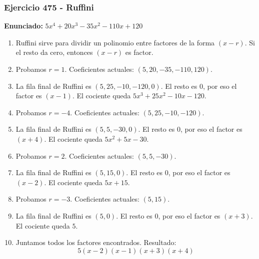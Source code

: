 \documentclass[11pt,a4paper]{article}
\begin{document}
\subsubsection*{Ejercicio 475 - Ruffini}
\textbf{Enunciado:} $ 5 x^{4} + 20 x^{3} - 35 x^{2} - 110 x + 120 $\par
\begin{enumerate}[leftmargin=2em]
\item Ruffini sirve para dividir un polinomio entre factores de la forma \((x-r)\). Si el resto da cero, entonces \((x-r)\) es factor.
\item Probamos \(r=1\). Coeficientes actuales: \((5, 20, -35, -110, 120)\).
\item La fila final de Ruffini es \((5, 25, -10, -120, 0)\). El resto es \(0\), por eso el factor es \((x-1)\). El cociente queda \(5 x^{3} + 25 x^{2} - 10 x - 120\).
\item Probamos \(r=-4\). Coeficientes actuales: \((5, 25, -10, -120)\).
\item La fila final de Ruffini es \((5, 5, -30, 0)\). El resto es \(0\), por eso el factor es \((x+4)\). El cociente queda \(5 x^{2} + 5 x - 30\).
\item Probamos \(r=2\). Coeficientes actuales: \((5, 5, -30)\).
\item La fila final de Ruffini es \((5, 15, 0)\). El resto es \(0\), por eso el factor es \((x-2)\). El cociente queda \(5 x + 15\).
\item Probamos \(r=-3\). Coeficientes actuales: \((5, 15)\).
\item La fila final de Ruffini es \((5, 0)\). El resto es \(0\), por eso el factor es \((x+3)\). El cociente queda \(5\).
\item Juntamos todos los factores encontrados. Resultado: \[\boxed{5 \left(x - 2\right) \left(x - 1\right) \left(x + 3\right) \left(x + 4\right)}\]
\end{enumerate}

\vspace{0.2cm}
\end{document}
